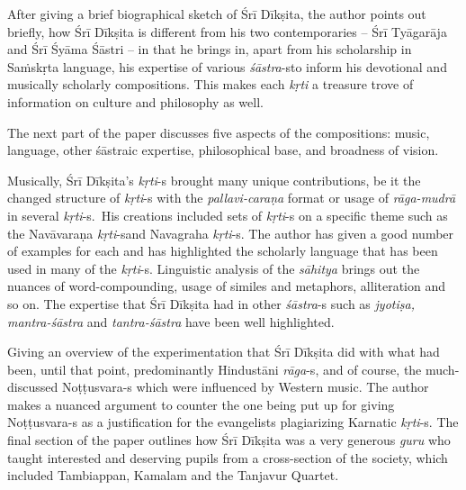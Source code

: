 After giving a brief biographical sketch of Śrī Dīkṣita, the author points out briefly, how Śrī Dīkṣita is different from his two contemporaries – Śrī Tyāgarāja and Śrī Śyāma Śāstri – in that he brings in, apart from his scholarship in Saṁskṛta language, his expertise of various \textit{śāstra}-s\break to inform his devotional and musically scholarly compositions. This makes each \textit{kṛti} a treasure trove of information on culture and philosophy as well. 

The next part of the paper discusses five aspects of the compositions: music, language, other śāstraic expertise, philosophical base, and broadness of vision.

Musically, Śrī Dīkṣita’s \textit{kṛti}-s brought many unique contributions, be it the changed structure of \textit{kṛti}-s with the \textit{pallavi-caraṇa} format or usage of \textit{rāga-mudrā} in several \textit{kṛti}-s.~His creations included sets of \textit{kṛti}-s on a specific theme such as the Navāvaraṇa \textit{kṛti}-s\break and Navagraha \textit{kṛti}-s. The author has given a good number of examples for each and has highlighted the scholarly language that has been used in many of the \textit{kṛti}-s. Linguistic analysis of the \textit{sāhitya} brings out the nuances of word-compounding, usage of similes and metaphors, alliteration and so on. The expertise that Śrī Dīkṣita had in other \textit{śāstra}-s such as \textit{jyotiṣa, mantra-śāstra} and \textit{tantra-śāstra} have been well highlighted.

Giving an overview of the experimentation that Śrī Dīkṣita did with what had been, until that point, predominantly Hindustāni \textit{rāga}-s, and of course, the much-discussed Noṭṭusvara-s which were influenced by Western music. The author makes a nuanced argument to counter the one being put up for giving Noṭṭusvara-s as a justification for the evangelists plagiarizing Karnatic \textit{kṛti}-s. The final section of the paper outlines how Śrī Dīkṣita was a very generous \textit{guru} who taught interested and deserving pupils from a cross-section of the society, which included Tambiappan, Kamalam and the Tanjavur Quartet.

